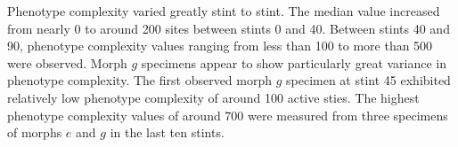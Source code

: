 Phenotype complexity varied greatly stint to stint.
The median value increased from nearly 0 to around 200 sites between stints 0 and 40.
Between stints 40 and 90, phenotype complexity values ranging from less than 100 to more than 500 were observed.
Morph $g$ specimens appear to show particularly great variance in phenotype complexity.
The first observed morph $g$ specimen at stint 45 exhibited relatively low phenotype complexity of around 100 active sties.
The highest phenotype complexity values of around 700 were measured from three specimens of morphs $e$ and $g$ in the last ten stints.
